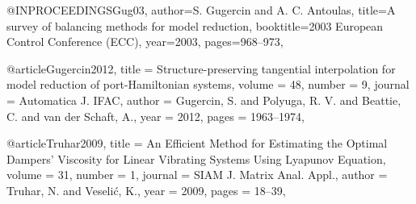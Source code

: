 @INPROCEEDINGS{Gug03,
  author={S. {Gugercin} and A. C. {Antoulas}},
  title={A survey of balancing methods for model reduction}, 
  booktitle={2003 European Control Conference (ECC)}, 
  year={2003},
  pages={968--973},
}

@article{Gugercin2012,
	title = {Structure-preserving tangential interpolation for model reduction of port-{Hamiltonian} systems},
	volume = {48},
	number = {9},
	journal = {Automatica J. IFAC},
	author = {Gugercin, S. and Polyuga, R. V. and Beattie, C. and van der Schaft, A.},
	year = {2012},
	pages = {1963--1974},
}

@article{Truhar2009,
	title = {An Efficient Method for Estimating the Optimal Dampers' Viscosity for Linear Vibrating Systems Using {L}yapunov Equation},
	volume = {31},
	number = {1},
	journal = {SIAM J. Matrix Anal. Appl.},
	author = {Truhar, N. and Veseli\'c, K.},
	year = {2009},
	pages = {18--39},
}

